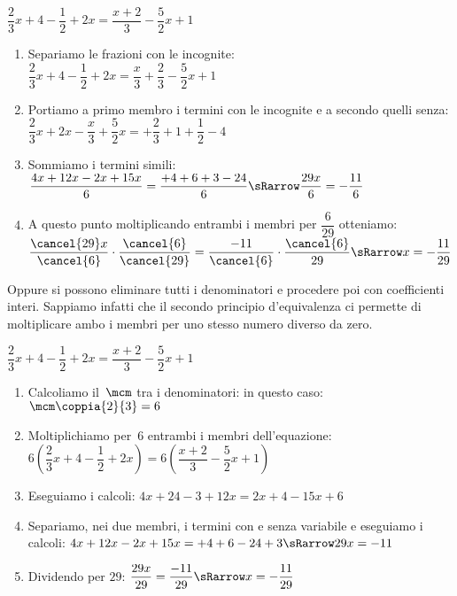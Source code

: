 \begin{esempio}{}{}
\(\dfrac{2}{3}x+4-\dfrac{1}{2}+2x=\dfrac{x+2}{3}-\dfrac{5}{2}x+1\)

\vspace{.5em}
\begin{enumerate}%
\item Separiamo le frazioni con le incognite: \\[1mm]
\(\dfrac{2}{3}x+4-\dfrac{1}{2}+2x=
\dfrac{x}{3}+\dfrac{2}{3}-\dfrac{5}{2}x+1\) 
\item Portiamo a primo membro i termini con le incognite e a secondo quelli 
senza:\\
\(\dfrac{2}{3}x+2x-\dfrac{x}{3}+\dfrac{5}{2}x=
+\dfrac{2}{3}+1+\dfrac{1}{2}-4\) 
\item Sommiamo i termini simili:\\[1mm]
\(\dfrac{4x+12x-2x+15x}{6} = \dfrac{+4+6+3-24}{6} \sRarrow
\dfrac{29x}{6} = -\dfrac{11}{6}\)
\item A questo punto moltiplicando entrambi i membri per 
\(\dfrac{6}{29}\) otteniamo:\\ 
\(\dfrac{\cancel{29}x}{\cancel{6}} \cdot \dfrac{\cancel{6}}{\cancel{29}} 
= 
\dfrac{-11}{\cancel{6}} \cdot \dfrac{\cancel{6}}{29} \sRarrow
x = -\dfrac{11}{29}
\)
\end{enumerate}
\end{esempio}

Oppure si possono eliminare tutti i denominatori e procedere poi con 
coefficienti interi.
Sappiamo infatti che il secondo principio d'equivalenza ci permette di 
moltiplicare ambo i membri per uno stesso numero diverso da zero.

\begin{esempio}{}{}
\(\dfrac{2}{3}x+4-\dfrac{1}{2}+2x=\dfrac{x+2}{3}-\dfrac{5}{2}x+1\)

\vspace{.5em}
\begin{enumerate}%
\item Calcoliamo il~\(\mcm\) tra i denominatori: in questo
caso: \(\mcm\coppia{2}{3} = 6\)
\item Moltiplichiamo per~6 entrambi i membri
dell'equazione: \\[1mm]
\(6\left(\dfrac{2}{3}x+4-\dfrac{1}{2}+2x\right)=6\left(\dfrac{x+2}{3}-
\dfrac{5}{2}x+1\right)\)
\item Eseguiamo i calcoli: \quad \(4x +24 -3 +12x = 2x +4 -15x +6\)
\item Separiamo, nei due membri, i termini con e senza variabile e 
eseguiamo i calcoli: \quad
\(4x +12x -2x +15x = +4 +6 -24 +3 \sRarrow 29x = -11\)
\item Dividendo per \(29\): \quad 
\(\dfrac{29x}{29} = \dfrac{-11}{29} \sRarrow x = -\dfrac{11}{29}\)
\end{enumerate}
\end{esempio}

